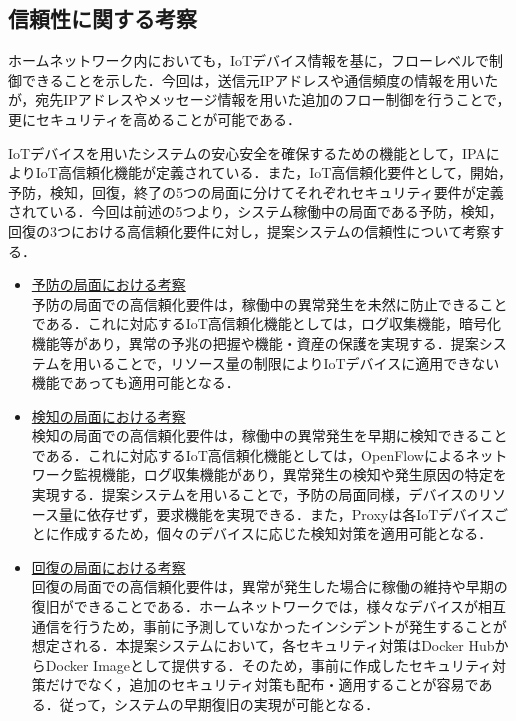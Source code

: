 \documentclass[a4paper,10pt,twocolumn,uplatex]{jsarticle}
\begin{document}
\subsection{信頼性に関する考察}
ホームネットワーク内においても，IoTデバイス情報を基に，フローレベルで制御できることを示した．今回は，送信元IPアドレスや通信頻度の情報を用いたが，宛先IPアドレスやメッセージ情報を用いた追加のフロー制御を行うことで，更にセキュリティを高めることが可能である．\par
IoTデバイスを用いたシステムの安心安全を確保するための機能として，IPAによりIoT高信頼化機能が定義されている．また，IoT高信頼化要件として，開始，予防，検知，回復，終了の5つの局面に分けてそれぞれセキュリティ要件が定義されている\cite{IPA}．今回は前述の5つより，システム稼働中の局面である予防，検知，回復の3つにおける高信頼化要件に対し，提案システムの信頼性について考察する．

\begin{itemize}
  \item \underline{予防の局面における考察}\mbox{}\\
        予防の局面での高信頼化要件は，稼働中の異常発生を未然に防止できることである．これに対応するIoT高信頼化機能としては，ログ収集機能，暗号化機能等があり，異常の予兆の把握や機能・資産の保護を実現する．提案システムを用いることで，リソース量の制限によりIoTデバイスに適用できない機能であっても適用可能となる．
  \item \underline{検知の局面における考察}\mbox{}\\
        検知の局面での高信頼化要件は，稼働中の異常発生を早期に検知できることである．これに対応するIoT高信頼化機能としては，OpenFlowによるネットワーク監視機能，ログ収集機能があり，異常発生の検知や発生原因の特定を実現する．提案システムを用いることで，予防の局面同様，デバイスのリソース量に依存せず，要求機能を実現できる．また，Proxyは各IoTデバイスごとに作成するため，個々のデバイスに応じた検知対策を適用可能となる．
  \item \underline{回復の局面における考察}\mbox{}\\
        回復の局面での高信頼化要件は，異常が発生した場合に稼働の維持や早期の復旧ができることである．ホームネットワークでは，様々なデバイスが相互通信を行うため，事前に予測していなかったインシデントが発生することが想定される．本提案システムにおいて，各セキュリティ対策はDocker HubからDocker Imageとして提供する．そのため，事前に作成したセキュリティ対策だけでなく，追加のセキュリティ対策も配布・適用することが容易である．従って，システムの早期復旧の実現が可能となる．
\end{itemize}
\end{document}
